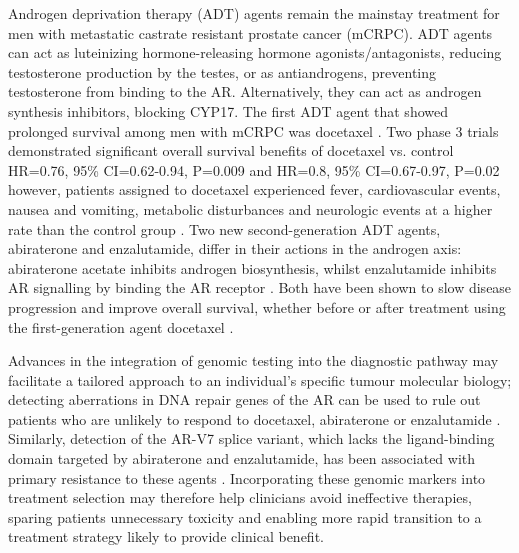 Androgen deprivation therapy (ADT) agents remain the mainstay treatment for men with metastatic castrate resistant prostate cancer (mCRPC). ADT agents can act as luteinizing hormone-releasing hormone agonists/antagonists, reducing testosterone production by the testes, or as antiandrogens, preventing testosterone from binding to the AR. Alternatively, they can act as androgen synthesis inhibitors, blocking CYP17. The first ADT agent that showed prolonged survival among men with mCRPC was docetaxel \cite{Sartor2018Feb}. Two phase 3 trials demonstrated significant overall survival benefits of docetaxel vs. control HR=0.76, 95\% CI=0.62-0.94, P=0.009 and HR=0.8, 95\% CI=0.67-0.97, P=0.02 \cite{Petrylak2004Oct, Tannock2004Oct} however, patients assigned to docetaxel experienced fever, cardiovascular events, nausea and vomiting, metabolic disturbances and neurologic events at a higher rate than the control group \cite{Petrylak2004Oct}. Two new second-generation ADT agents, abiraterone and enzalutamide, differ in their actions in the androgen axis: abiraterone acetate inhibits androgen biosynthesis, whilst enzalutamide inhibits AR signalling by binding the AR receptor \cite{Litwin2017Jun}. Both have been shown to slow disease progression and improve overall survival, whether before or after treatment using the first-generation agent docetaxel \cite{deBono2011May, Ryan2013Jan, Scher2012Sep, Beer2014Jul}. \par
Advances in the integration of genomic testing into the diagnostic pathway may facilitate a tailored approach to an individual's specific tumour molecular biology; detecting aberrations in DNA repair genes of the AR can be used to rule out patients who are unlikely to respond to docetaxel, abiraterone or enzalutamide \cite{Mateo2015Oct}. Similarly, detection of the AR-V7 splice variant, which lacks the ligand-binding domain targeted by abiraterone and enzalutamide, has been associated with primary resistance to these agents \cite{Antonarakis2014Sep}. Incorporating these genomic markers into treatment selection may therefore help clinicians avoid ineffective therapies, sparing patients unnecessary toxicity and enabling more rapid transition to a treatment strategy likely to provide clinical benefit.


